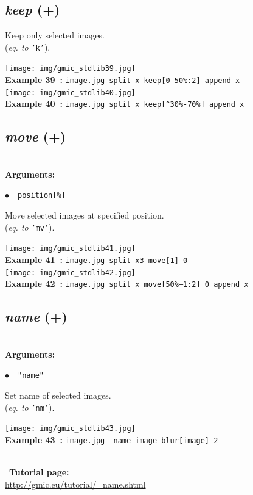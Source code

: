 \documentclass[a4paper,10.5pt,twoside]{book}
\def\comma{\discretionary{,}{}{,}}
\newcommand{\Cb}[1]{\textcolor{cb}{#1}}
\begin{document}
\subsection{\emph{keep} (+)}\vspace*{-0.7em}
Keep only selected images.
~\\(\emph{eq. to} {\small \texttt{'k'}}).
\begin{center}\texttt{[image: img/gmic\_stdlib39.jpg]}\\
{\footnotesize \textbf{Example 39~:} \texttt{image.jpg split x keep[0-50\%:2] append x}}
\\\texttt{[image: img/gmic\_stdlib40.jpg]}\\
{\footnotesize \textbf{Example 40~:} \texttt{image.jpg split x keep[\textasciicircum 30\%-70\%] append x}}
\end{center}

\subsection{\emph{move} (+)}\vspace*{-0.7em}
~\\\textbf{\Cb{Arguments: }}\begin{flushleft}
{\small \Cb{\hspace*{0.5cm}$\bullet$~~\texttt{position[\%]}}}\end{flushleft}
Move selected images at specified position.
~\\(\emph{eq. to} {\small \texttt{'mv'}}).
\begin{center}\texttt{[image: img/gmic\_stdlib41.jpg]}\\
{\footnotesize \textbf{Example 41~:} \texttt{image.jpg split x{\comma}3 move[1] 0}}
\\\texttt{[image: img/gmic\_stdlib42.jpg]}\\
{\footnotesize \textbf{Example 42~:} \texttt{image.jpg split x move[50\%--1:2] 0 append x}}
\end{center}

\subsection{\emph{name} (+)}\vspace*{-0.7em}
~\\\textbf{\Cb{Arguments: }}\begin{flushleft}
{\small \Cb{\hspace*{0.5cm}$\bullet$~~\texttt{"name"}}}\end{flushleft}
Set name of selected images.
~\\(\emph{eq. to} {\small \texttt{'nm'}}).
\begin{center}\texttt{[image: img/gmic\_stdlib43.jpg]}\\
{\footnotesize \textbf{Example 43~:} \texttt{image.jpg -name image blur[image] 2}}
\end{center}
~\\
~\textbf{Tutorial page: }\\\url{http://gmic.eu/tutorial/\_name.shtml}
\end{document}
